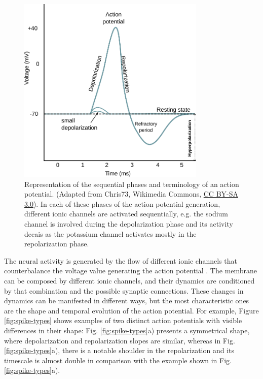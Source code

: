 \begin{figure}[htb!]
    \centering
    \includegraphics[width=0.8\textwidth]{img/intro/action_potential.pdf}
    \caption{Representation of the sequential  phases and terminology of an action potential. (Adapted from Chris73, Wikimedia Commons, \href{https://creativecommons.org/licenses/by-sa/3.0/}{CC BY-SA 3.0}). In each of these phases of the action potential generation, different ionic channels are activated sequentially, e.g. the sodium channel is involved during the depolarization phase and its activity decais as the potassium channel activates mostly in the repolarization phase. }
    \label{fig:action potential}
\end{figure}

The neural activity is generated by the flow of different ionic channels that counterbalance the voltage value generating the action potential \parencite{koch_biophysics_1999}. The membrane can be composed by different ionic channels, and their dynamics are conditioned by that combination and the possible synaptic connections. These changes in dynamics can be manifested in different ways, but the most characteristic ones are the shape and temporal evolution of the action potential. %
For example, Figure \ref{fig:spike-types} shows examples of two distinct action potentials with visible differences in their shape: Fig. \ref{fig:spike-types}a) presents a symmetrical shape, where depolarization and repolarization slopes are similar, whereas in Fig. \ref{fig:spike-types}a), there is a notable shoulder in the repolarization and its timescale is almost double in comparison with the example shown in Fig.\ref{fig:spike-types}a).

